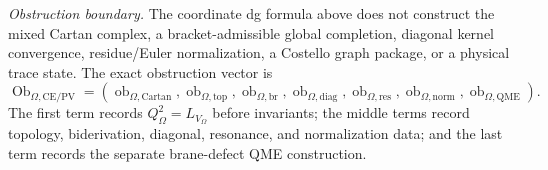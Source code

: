 \begin{stmt}
  \emph{Obstruction boundary.} The coordinate dg formula above does not
  construct the mixed Cartan complex, a bracket-admissible global
  completion, diagonal kernel convergence, residue/Euler normalization,
  a Costello graph package, or a physical trace state.  The exact
  obstruction vector is
  \[
    \operatorname{Ob}_{\Omega,\mathrm{CE/PV}}
    =
    (\operatorname{ob}_{\Omega,\mathrm{Cartan}},
     \operatorname{ob}_{\Omega,\mathrm{top}},
     \operatorname{ob}_{\Omega,\mathrm{br}},
     \operatorname{ob}_{\Omega,\mathrm{diag}},
     \operatorname{ob}_{\Omega,\mathrm{res}},
     \operatorname{ob}_{\Omega,\mathrm{norm}},
     \operatorname{ob}_{\Omega,\mathrm{QME}}).
  \]
  The first term records \(Q_\Omega^2=L_{V_\Omega}\) before invariants;
  the middle terms record topology, biderivation, diagonal, resonance,
  and normalization data; and the last term records the separate
  brane-defect QME construction.
\end{stmt}

